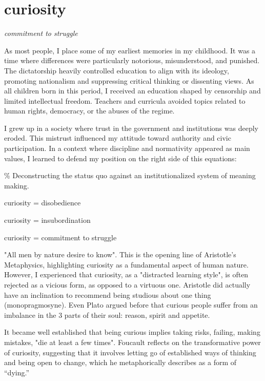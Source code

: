 \chapter*{curiosity}
\begin{center}
\vspace{2cm}
\begin{flushright}
\large
\textit{commitment to struggle}
\end{flushright}
\vspace*{\fill}
\end{center}

\normalsize

As most people, I place some of my earliest memories in my childhood. It was a time where differences were particularly notorious, misunderstood, and punished. The dictatorship heavily controlled education to align with its ideology, promoting nationalism and suppressing critical thinking or dissenting views. As all children born in this period, I received an education shaped by censorship and limited intellectual freedom. Teachers and curricula avoided topics related to human rights, democracy, or the abuses of the regime. 

I grew up in a society where trust in the government and institutions was deeply eroded. This mistrust influenced my attitude toward authority and civic participation. In a context where discipline and normativity appeared as main values, I learned to defend my position on the right side of this equations: 

{\scriptsize \textcolor{comment}{\%  Deconstructing the status quo against an institutionalized system of meaning making.}}

curiosity = disobedience

curiosity = insubordination

curiosity = commitment to struggle 

"All men by nature desire to know". This is the opening line of Aristotle's Metaphysics, highlighting curiosity as a fundamental aspect of human nature.  However, I experienced that curiosity, as a "distracted learning style", is often rejected as a vicious form, as opposed to a virtuous one. Aristotle did actually have an inclination to recommend being studious about one thing (monopragmosyne). Even Plato argued before that curious people suffer from an imbalance in the 3 parts of their soul: reason, spirit and appetite. \citep{perry2020}

It became well established that being curious implies taking risks, failing, making mistakes, "die at least a few times". \citep{foucault1980masked} Foucault reflects on the transformative power of curiosity, suggesting that it involves letting go of established ways of thinking and being open to change, which he metaphorically describes as a form of “dying.”


